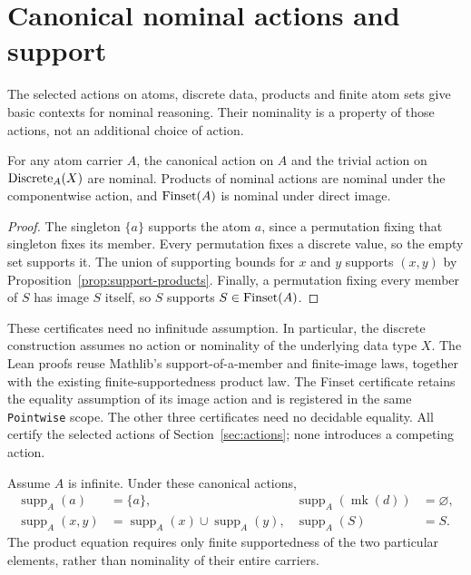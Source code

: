 \section{Canonical nominal actions and support}
\label{sec:canonical-support}

The selected actions on atoms, discrete data, products and finite atom sets
give basic contexts for nominal reasoning. Their nominality is a property
of those actions, not an additional choice of action.

\begin{proposition}
\label{prop:canonical-nominality}
For any atom carrier $A$, the canonical action on $A$ and the trivial action
on $\operatorname{Discrete}_A(X)$ are nominal. Products of nominal actions are nominal
under the componentwise action, and $\operatorname{Finset}(A)$ is nominal under direct image.
\end{proposition}

\begin{proof}
The singleton $\{a\}$ supports the atom $a$, since a permutation fixing
that singleton fixes its member. Every permutation fixes a discrete value,
so the empty set supports it. The union of supporting bounds for $x$ and
$y$ supports $(x,y)$ by Proposition~\ref{prop:support-products}.
Finally, a permutation fixing every member of $S$ has image $S$ itself,
so $S$ supports $S\in\operatorname{Finset}(A)$.
\end{proof}

These certificates need no infinitude assumption. In particular, the
discrete construction assumes no action or nominality of the underlying
data type $X$. The Lean proofs reuse Mathlib's support-of-a-member and
finite-image laws, together with the existing finite-supportedness product
law. The Finset certificate retains the equality assumption of its image
action and is registered in the same \texttt{Pointwise} scope. The other
three certificates need no decidable equality. All certify the selected
actions of Section~\ref{sec:actions}; none introduces a competing action.

\begin{proposition}
\label{prop:canonical-support}
Assume $A$ is infinite. Under these canonical actions,
\begin{align*}
  \operatorname{supp}_A(a)&=\{a\}, &
  \operatorname{supp}_A(\operatorname{mk}(d))&=\varnothing,\\
  \operatorname{supp}_A(x,y)&=
    \operatorname{supp}_A(x)\cup\operatorname{supp}_A(y), &
  \operatorname{supp}_A(S)&=S.
\end{align*}
The product equation requires only finite supportedness of the two
particular elements, rather than nominality of their entire carriers.
\end{proposition}

